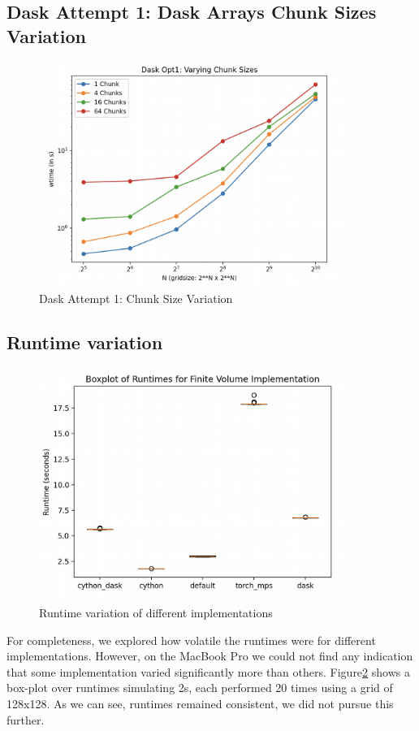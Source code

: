 \documentclass[a4paper,10pt]{article}
\begin{document}
\subsection{Dask Attempt 1: Dask Arrays Chunk Sizes Variation}
\begin{figure}[H]
  \centering
  \includegraphics[width=0.9\textwidth]{images/dask/dask_opt1_chunk_size.png}
  \caption{Dask Attempt 1: Chunk Size Variation}
  \label{fig:dask_opt1_chunk_size}
\end{figure}

\subsection{Runtime variation}
\begin{figure}[H]
  \centering
  \includegraphics[width=0.9\textwidth]{images/misc/boxplot_128grid_2sec}
  \caption{Runtime variation of different implementations}
  \label{fig:runtime_boxplot}
\end{figure}
For completeness, we explored how volatile the runtimes were for different implementations.
However, on the MacBook Pro we could not find any indication that some implementation varied significantly more than others.
Figure\ref{fig:runtime_boxplot} shows a box-plot over runtimes simulating 2s, each performed 20 times using a grid of 128x128.
As we can see, runtimes remained consistent, we did not pursue this further.


\end{document}
